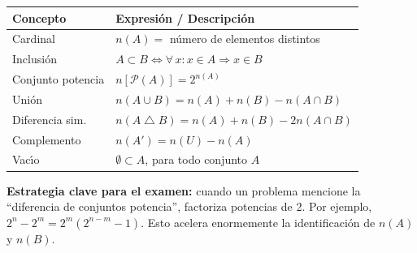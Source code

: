 \begin{cajaformula}
  \begin{center}
    \renewcommand{\arraystretch}{1.4}
    \begin{tabular}{@{}ll@{}}
      \toprule
      \rowcolor{AzulClaro!60}
      \textbf{Concepto} & \textbf{Expresi\'on / Descripci\'on} \\
      \midrule
      Cardinal         & $n(A) = $ n\'umero de elementos distintos \\
      Inclusi\'on      & $A \subset B \Leftrightarrow \forall\,x: x\in A \Rightarrow x\in B$ \\
      Conjunto potencia& $n[\mathcal{P}(A)] = 2^{n(A)}$ \\
      Uni\'on          & $n(A \cup B) = n(A)+n(B)-n(A\cap B)$ \\
      Diferencia sim.  & $n(A\mathbin{\triangle}B) = n(A)+n(B)-2n(A\cap B)$ \\
      Complemento      & $n(A') = n(U) - n(A)$ \\
      Vac\'{\i}o       & $\emptyset \subset A$, para todo conjunto $A$ \\
      \bottomrule
    \end{tabular}
  \end{center}
\end{cajaformula}

\begin{cajatip}
  \textbf{Estrategia clave para el examen:} cuando un problema mencione la
  ``diferencia de conjuntos potencia'', factoriza potencias de 2.
  Por ejemplo, $2^{n} - 2^{m} = 2^{m}(2^{n-m}-1)$. Esto acelera enormemente
  la identificaci\'on de $n(A)$ y $n(B)$.
\end{cajatip}

